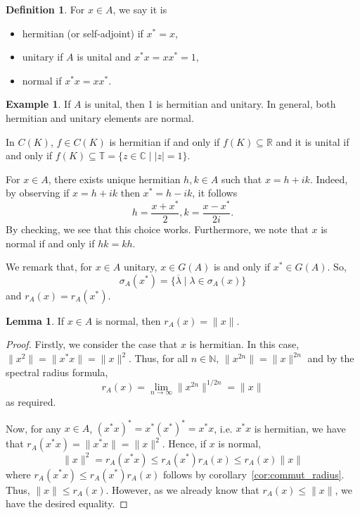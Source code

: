 \documentclass[]{article}
\theoremstyle{definition}
\newtheorem{definition}{Definition}[section]
\newtheorem{lemma}{Lemma}[section]
\newtheorem{example}{Example}[section]
\begin{document}
\begin{definition}
  For \(x \in A\), we say it is
  \begin{itemize}
    \item hermitian (or self-adjoint) if \(x^* = x\),
    \item unitary if \(A\) is unital and \(x^*x = x x^* = 1\),
    \item normal if \(x^*x = x x^*\).
  \end{itemize}
\end{definition}

\begin{example}
  If \(A\) is unital, then 1 is hermitian and unitary. In general, both hermitian and unitary elements 
  are normal.
\end{example}

In \(C(K)\), \(f \in C(K)\) is hermitian if and only if \(f(K) \subseteq \mathbb{R}\) and it is 
unital if and only if \(f(K) \subseteq \mathbb{T} = \{z \in \mathbb{C} \mid |z| = 1\}\).

For \(x \in A\), there exists unique hermitian \(h, k \in A\) such that \(x = h + ik\). Indeed, 
by observing if \(x = h + ik\) then \(x^* = h - ik\), it follows 
\[h = \frac{x + x^*}{2}, k = \frac{x - x^*}{2i}.\]
By checking, we see that this choice works. 
Furthermore, we note that \(x\) is normal if and only if \(hk = kh\).

We remark that, for \(x \in A\) unitary, \(x \in G(A)\) is and only if \(x^* \in G(A)\). So, 
\[\sigma_A(x^*) = \{\overline\lambda \mid \lambda \in \sigma_A(x)\}\]
and \(r_A(x) = r_A(x^*)\).

\begin{lemma}
 If \(x \in A\) is normal, then \(r_A(x) = \|x\|\). 
\end{lemma}
\begin{proof}
  Firstly, we consider the case that \(x\) is hermitian. In this case, 
  \(\|x^2\| = \|x^*x\| = \|x\|^2\). Thus, for all \(n \in \mathbb{N}\), \(\|x^{2n}\| = \|x\|^{2n}\) 
  and by the spectral radius formula, 
  \[r_A(x) = \lim_{n \to \infty} \|x^{2n}\|^{1 / 2n} = \|x\|\]
  as required.
  
  Now, for any \(x \in A\), \((x^* x)^* = x^* (x^*)^* = x^* x\), i.e. \(x^*x\) is hermitian, we have 
  that \(r_A(x^*x) = \|x^*x\| = \|x\|^2\). Hence, if \(x\) is normal,  
  \[\|x\|^2 = r_A(x^*x) \le r_A(x^*)r_A(x) \le r_A(x)\|x\|\]
  where \(r_A(x^*x) \le r_A(x^*)r_A(x)\) follows by corollary~\ref{cor:commut_radius}.
  Thus, \(\|x\| \le r_A(x)\). However, as we already know that \(r_A(x) \le \|x\|\), we have the 
  desired equality.
\end{proof}
\end{document}
